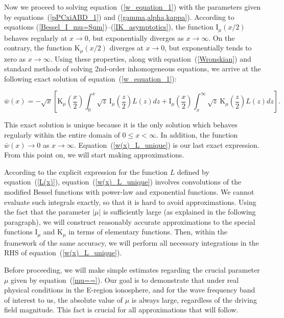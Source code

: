 \documentclass[draft]{agujournal2019}
\begin{document}
Now we proceed to solving equation~(\ref{w_equation_1}) with the parameters
given by equations~(\ref{pPCxiABD_1}) and (\ref{gamma,alpha,kappa}). According
to equations (\ref{Bessel_I_mu=Sum})--(\ref{IK_asymptotics}), the function $\mathrm{I}_{\mu}\left(  x/2\right)  $
behaves regularly at $x\rightarrow0$, but exponentially diverges as
$x\rightarrow\infty$. On the contrary, the function $\mathrm{K}_{\mu}\left(
x/2\right)  $ diverges at $x\rightarrow0$, but exponentially tends to zero as
$x\rightarrow\infty$. Using these properties, along with equation~(\ref{Wronskian}) and standard methods of solving
2nd-order inhomogeneous equations, we arrive at the following exact solution of equation~(\ref{w_equation_1}):
\begin{linenomath*}
\begin{equation}
\bar{w}(x)=-\sqrt{x}\left[  \mathrm{K}_{\mu}\left(  \frac{x}{2}\right)
\int_{0}^{x}\sqrt{z}\ \mathrm{I}_{\mu}\left(  \frac{z}{2}\right)
L(z)dz+\mathrm{I}_{\mu}\left(  \frac{x}{2}\right)  \int_{x}^{\infty}\sqrt
{z}\ \mathrm{K}_{\mu}\left(  \frac{z}{2}\right)  L(z)dz\right]  .
\label{w(x)_L_unique}
\end{equation}
\end{linenomath*}
This exact solution is unique because it is the only solution which behaves regularly within the entire domain
of $0\leq x<\infty$. In addition, the function $\bar{w}(x)\rightarrow0$ as
$x\rightarrow\infty$. Equation~(\ref{w(x)_L_unique}) is our last exact expression. 
From this point on, we will start making approximations.

According to the explicit expression for the function $L$ defined by
equation~(\ref{L(x)}), equation~(\ref{w(x)_L_unique}) involves convolutions of
the modified Bessel functions with power-law and exponential functions.
We cannot evaluate such integrals exactly, so that it is hard to avoid approximations. 
Using the fact that the parameter $|\mu|$ is sufficiently 
large (as explained in the following paragraph), we will construct reasonably accurate
approximations to the special functions $\mathrm{I}_{\mu}$ and $\mathrm{K}_{\mu}$ in
terms of elementary functions. Then, within the framework of the same
accuracy, we will perform all necessary integrations in the RHS of
equation~(\ref{w(x)_L_unique}).

Before proceeding, we will make simple estimates
regarding the crucial parameter $\mu$ given by equation~(\ref{mu==}). Our goal
is to demonstrate that under real physical conditions in the E-region
ionosphere, and for the wave frequency band of interest to us, the absolute value of $\mu$ is always large, regardless of the
driving field magnitude. This fact is crucial for all approximations that will follow.
\end{document}
